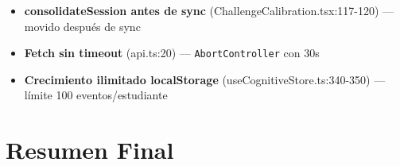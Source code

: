 \documentclass[12pt,a4paper]{article}
\begin{document}
\begin{itemize}
  \item[\textcolor{orange}{M}] \textbf{consolidateSession antes de sync} (ChallengeCalibration.tsx:117-120) --- movido después de sync
  \item[\textcolor{orange}{M}] \textbf{Fetch sin timeout} (api.ts:20) --- \texttt{AbortController} con 30s
  \item[\textcolor{orange}{M}] \textbf{Crecimiento ilimitado localStorage} (useCognitiveStore.ts:340-350) --- límite 100 eventos/estudiante
\end{itemize}

\section{Resumen Final}
\end{document}
